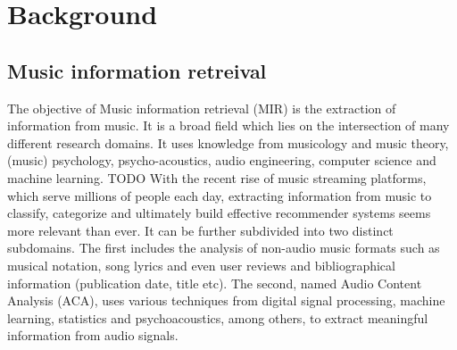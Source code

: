 \documentclass[11pt]{article}
\begin{document}
\pagebreak

\section{Background}
\label{sec:org4d1b31d}
\subsection{Music information retreival}
\label{sec:orge32af72}

The objective of Music information retrieval (MIR) is the extraction of information from music. It is a broad field which lies on the intersection of many different research domains. It uses knowledge from musicology and music theory, (music) psychology, psycho-acoustics, audio engineering, computer science and machine learning. TODO With the recent rise of music streaming platforms, which serve millions of people each day, extracting information from music to classify, categorize and ultimately build effective recommender systems seems more relevant than ever.
It can be further subdivided into two distinct subdomains. The first includes the analysis of non-audio music formats such as musical notation, song lyrics and even user reviews and bibliographical information (publication date, title etc). The second, named Audio Content Analysis (ACA), uses various techniques from digital signal processing, machine learning, statistics and psychoacoustics, among others, to extract meaningful information from audio signals.

\end{document}
